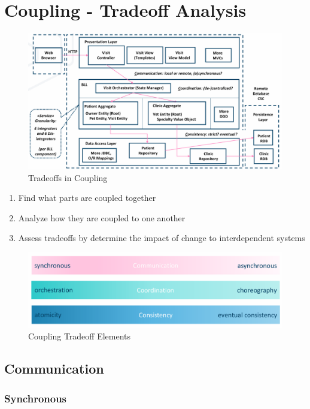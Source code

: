 \documentclass[../Main.tex]{subfiles}
\begin{document}
\newpage
\section{Coupling - Tradeoff Analysis}
\begin{figure}[H]
    \centering
    \includegraphics[width=1\linewidth]{Images/coupling-tradeoff.png}
    \caption{Tradeoffs in Coupling}
\end{figure}

\begin{enumerate}
    \item Find what parts are coupled together
    \item Analyze how they are coupled to one another
    \item Assess tradeoffs by determine the impact of change to interdependent systems
\end{enumerate}

\begin{figure}[H]
    \centering
    \includegraphics[width=1\linewidth]{Images/coupling-elements.png}
    \caption{Coupling Tradeoff Elements}
\end{figure}
\newpage
\subsection{Communication}
\subsubsection{Synchronous}
\end{document}
